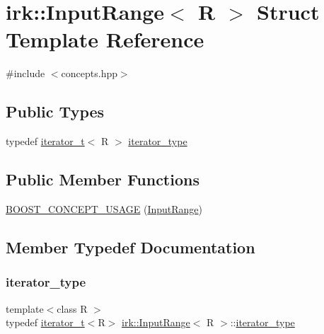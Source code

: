 \hypertarget{structirk_1_1InputRange}{}\section{irk\+:\+:Input\+Range$<$ R $>$ Struct Template Reference}
\label{structirk_1_1InputRange}


{\ttfamily \#include $<$concepts.\+hpp$>$}

\subsection*{Public Types}
\begin{DoxyCompactItemize}
\item 
typedef \mbox{\hyperlink{namespaceirk_a333e3104afd57c79fb0c18b90081520a}{iterator\+\_\+t}}$<$ R $>$ \mbox{\hyperlink{structirk_1_1InputRange_a86702fd3c4e30f53e610cd5969019b28}{iterator\+\_\+type}}
\end{DoxyCompactItemize}
\subsection*{Public Member Functions}
\begin{DoxyCompactItemize}
\item 
\mbox{\hyperlink{structirk_1_1InputRange_ac405dcd6545d58c930c6a9476578a4ae}{B\+O\+O\+S\+T\+\_\+\+C\+O\+N\+C\+E\+P\+T\+\_\+\+U\+S\+A\+GE}} (\mbox{\hyperlink{structirk_1_1InputRange}{Input\+Range}})
\end{DoxyCompactItemize}


\subsection{Member Typedef Documentation}
\mbox{\label{structirk_1_1InputRange_a86702fd3c4e30f53e610cd5969019b28}} 
\subsubsection{\texorpdfstring{iterator\+\_\+type}{iterator\_type}}
{\footnotesize\ttfamily template$<$class R $>$ \\
typedef \mbox{\hyperlink{namespaceirk_a333e3104afd57c79fb0c18b90081520a}{iterator\+\_\+t}}$<$R$>$ \mbox{\hyperlink{structirk_1_1InputRange}{irk\+::\+Input\+Range}}$<$ R $>$\+::\mbox{\hyperlink{structirk_1_1InputRange_a86702fd3c4e30f53e610cd5969019b28}{iterator\+\_\+type}}}



